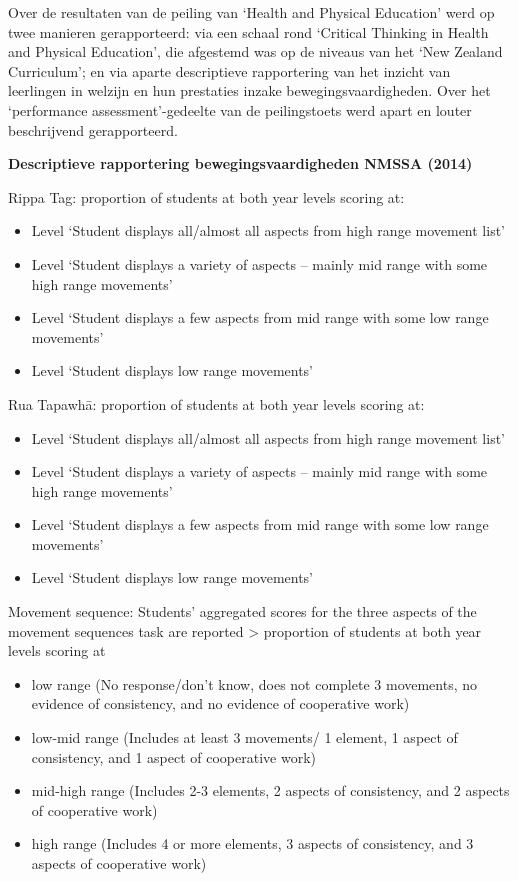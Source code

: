 \documentclass[
  letterpaper,
]{report}
\providecommand{\tightlist}{%
  \setlength{\itemsep}{0pt}\setlength{\parskip}{0pt}}
\begin{document}
Over de resultaten van de peiling van `Health and Physical Education'
werd op twee manieren gerapporteerd: via een schaal rond `Critical
Thinking in Health and Physical Education', die afgestemd was op de
niveaus van het `New Zealand Curriculum'; en via aparte descriptieve
rapportering van het inzicht van leerlingen in welzijn en hun prestaties
inzake bewegingsvaardigheden. Over het `performance assessment'-gedeelte
van de peilingstoets werd apart en louter beschrijvend gerapporteerd.

\textbf{Descriptieve rapportering bewegingsvaardigheden NMSSA (2014)}

Rippa Tag: proportion of students at both year levels scoring at:

\begin{itemize}
\tightlist
\item
  Level `Student displays all/almost all aspects from high range
  movement list'
\item
  Level `Student displays a variety of aspects -- mainly mid range with
  some high range movements'
\item
  Level `Student displays a few aspects from mid range with some low
  range movements'
\item
  Level `Student displays low range movements'
\end{itemize}

Rua Tapawhā: proportion of students at both year levels scoring at:

\begin{itemize}
\tightlist
\item
  Level `Student displays all/almost all aspects from high range
  movement list'
\item
  Level `Student displays a variety of aspects -- mainly mid range with
  some high range movements'
\item
  Level `Student displays a few aspects from mid range with some low
  range movements'
\item
  Level `Student displays low range movements'
\end{itemize}

Movement sequence: Students' aggregated scores for the three aspects of
the movement sequences task are reported \textgreater{} proportion of
students at both year levels scoring at

\begin{itemize}
\tightlist
\item
  low range (No response/don't know, does not complete 3 movements, no
  evidence of consistency, and no evidence of cooperative work)
\item
  low-mid range (Includes at least 3 movements/ 1 element, 1 aspect of
  consistency, and 1 aspect of cooperative work)
\item
  mid-high range (Includes 2-3 elements, 2 aspects of consistency, and 2
  aspects of cooperative work)
\item
  high range (Includes 4 or more elements, 3 aspects of consistency, and
  3 aspects of cooperative work)
\end{itemize}
\end{document}
